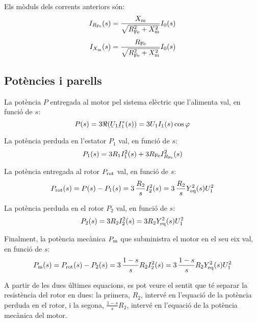Els mòduls dels corrents anteriors són:
\begin{subequations}
\begin{align}
    I_{R_\mathrm{Fe}}(s) &=  \frac{X_\mathrm{m}}{\sqrt{R_\mathrm{Fe}^2 + X_\mathrm{m}^2}}  I_0(s) \\[1ex]
    I_{X_\mathrm{m}}(s) &=   \frac{R_\mathrm{Fe}}{\sqrt{R_\mathrm{Fe}^2 + X_\mathrm{m}^2}}  I_0(s)
\end{align}
\end{subequations}

\subsection{Potències i parells}

La potència  $P$ entregada al motor pel sistema elèctric que l'alimenta val, en funció de $s$:
\begin{equation}
    P(s)  =  3 \Re(\cmplx{U}_1 \cmplx{I}_1^*(s)) = 3 U_1 I_1(s) \cos\varphi
\end{equation}

La potència perduda en l'estator $P_1$ val, en funció de $s$:
\begin{equation}
    P_1(s)  =  3 R_1 I_1^2(s) + 3 R_\mathrm{Fe} I_{R_\mathrm{Fe}}^2(s)
\end{equation}

La potència entregada al rotor $P_\mathrm{rot}$  val, en funció de $s$:
\begin{equation}
    P_\mathrm{rot}(s)  =  P(s) - P_1(s) = 3 \,\frac{R_2}{s} I_2^2(s) = 3 \,\frac{R_2}{s} Y_\mathrm{eq}^2(s) U_1^2
\end{equation}

La potència perduda en el rotor $P_2$ val, en funció de $s$:
\begin{equation}
    P_2(s)  =  3 R_2 I_2^2(s) = 3 R_2 Y_\mathrm{eq}^2(s) U_1^2
\end{equation}

Finalment, la potència mecànica $P_\mathrm{m}$ que subministra el motor en el seu eix val, en funció de $s$:
\begin{equation}
    P_\mathrm{m}(s)  =  P_\mathrm{rot}(s) - P_2(s) = 3 \,\frac{1-s}{s} R_2 I_2^2(s) = 3 \,\frac{1-s}{s} R_2 Y_\mathrm{eq}^2(s) U_1^2 \label{eq:Pm-I2-U1}
\end{equation}

A partir de les dues últimes equacions, es pot veure el sentit que té separar la resistència del rotor en dues: la primera, $R_2$,  intervé en l'equació de la potència perduda en el rotor, i la segona, $\frac{1-s}{s} R_2$,  intervé en l'equació de la potència mecànica del motor.

